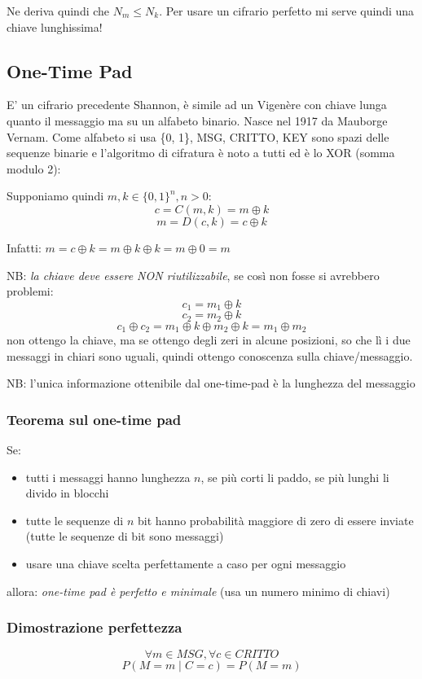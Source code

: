 Ne deriva quindi che $N_m \leq N_k$. Per usare un cifrario perfetto mi serve quindi una chiave lunghissima!

\subsection{One-Time Pad}
E' un cifrario precedente Shannon, è simile ad un Vigenère con chiave lunga quanto il messaggio ma su un alfabeto binario. Nasce nel 1917 da Mauborge Vernam. Come alfabeto si usa \{0, 1\}, MSG, CRITTO, KEY sono spazi delle sequenze binarie e l'algoritmo di cifratura è noto a tutti ed è lo XOR (somma modulo 2):

Supponiamo quindi $m, k \in \{0, 1\}^{n}, n > 0$:
$$ c = C(m, k) = m \oplus k $$
$$ m = D(c, k) = c \oplus k$$

Infatti: $m = c \oplus k = m \oplus k \oplus k = m \oplus 0 = m$

NB: \emph{la chiave deve essere NON riutilizzabile}, se così non fosse si avrebbero problemi:
$$ c_1 = m_1 \oplus k $$
$$ c_2 = m_2 \oplus k $$
$$ c_1 \oplus c_2 = m_1 \oplus k \oplus m_2 \oplus k = m_1 \oplus m_2 $$
non ottengo la chiave, ma se ottengo degli zeri in alcune posizioni, so che lì i due messaggi in chiari sono uguali, quindi ottengo conoscenza sulla chiave/messaggio.

NB: l'unica informazione ottenibile dal one-time-pad è la lunghezza del messaggio

\subsubsection{Teorema sul one-time pad}
Se:
\begin{itemize}
    \item tutti i messaggi hanno lunghezza $n$, se più corti li paddo, se più lunghi li divido in blocchi
    \item tutte le sequenze di $n$ bit hanno probabilità maggiore di zero di essere inviate (tutte le sequenze di bit sono messaggi)
    \item usare una chiave scelta perfettamente a caso per ogni messaggio
\end{itemize}
allora: \emph{one-time pad è perfetto e minimale} (usa un numero minimo di chiavi)

\subsubsection{Dimostrazione perfettezza}
$$ \forall m \in MSG, \forall c \in CRITTO $$
$$ P(M=m \mid C=c) = P(M=m) $$

